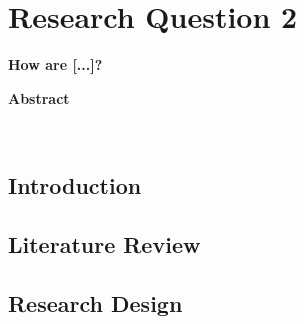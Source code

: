 \chapter{Research Question 2} \label{cha:essay2}
\thispagestyle{empty}
{\noindent \Large \textbf{How are [...]?}}
\vspace{1cm}


\therule
\centerline{\textbf{Abstract}} \\
 \par
\therule

\section*{Introduction} \label{sec:essay2_introduction}
    

\section{Literature Review} \label{sec:essay2_literature}
    
    
\section{Research Design} \label{sec:essay2_design}
    
    